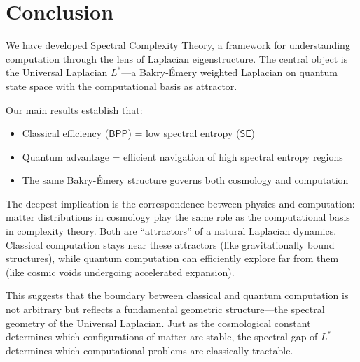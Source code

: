 \documentclass[11pt,a4paper]{article}
\theoremstyle{plain}
\theoremstyle{definition}
\theoremstyle{remark}
\newcommand{\BPP}{\mathsf{BPP}}
\newcommand{\SE}{\mathsf{SE}}
\begin{document}
\section{Conclusion}

We have developed Spectral Complexity Theory, a framework for understanding computation through the lens of Laplacian eigenstructure. The central object is the Universal Laplacian $L^*$---a Bakry-\'Emery weighted Laplacian on quantum state space with the computational basis as attractor.

Our main results establish that:
\begin{itemize}[noitemsep]
    \item Classical efficiency ($\BPP$) = low spectral entropy ($\SE$)
    \item Quantum advantage = efficient navigation of high spectral entropy regions
    \item The same Bakry-\'Emery structure governs both cosmology and computation
\end{itemize}

The deepest implication is the correspondence between physics and computation: matter distributions in cosmology play the same role as the computational basis in complexity theory. Both are ``attractors'' of a natural Laplacian dynamics. Classical computation stays near these attractors (like gravitationally bound structures), while quantum computation can efficiently explore far from them (like cosmic voids undergoing accelerated expansion).

This suggests that the boundary between classical and quantum computation is not arbitrary but reflects a fundamental geometric structure---the spectral geometry of the Universal Laplacian. Just as the cosmological constant determines which configurations of matter are stable, the spectral gap of $L^*$ determines which computational problems are classically tractable.

\begin{center}
\end{center}
\end{document}

